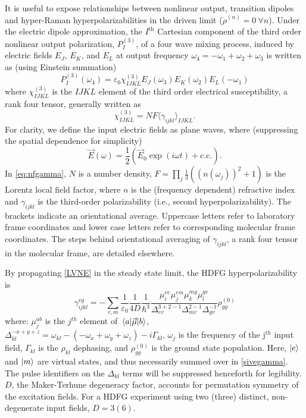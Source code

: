 \documentclass[aip, jcp, reprint, onecolumn, nofootinbib]{revtex4-2}
\begin{document}
It is useful to expose relationships between nonlinear output, transition dipoles and hyper-Raman hyperpolarizabilities in the driven limit ($\dot{\rho}^{(n)} = 0 \ \forall n$). \cite{Moad2005}
Under the electric dipole approximation, the $I^\text{th}$ Cartesian component of the third order nonlinear output polarization, ${P}^{(3)}_I$, of a four wave mixing process, induced by electric fields $E_J$, $E_K$, and $E_L$ at output frequency $\omega_4=-\omega_1 + \omega_2 + \omega_3$ is written as (using Einstein summation) \cite{RN307}
\begin{equation} \label{polarization}
{P}^{(3)}_I (\omega_4)  = \varepsilon_0 \chi^{(3)}_{IJKL} E_J(\omega_3) E_K(\omega_2) E_L(- \omega_1) 
\end{equation}
where $\chi^{(3)}_{IJKL}$ is the $IJKL$ element of the third order electrical susceptibility, a rank four tensor, generally written as
\begin{equation}\label{eq:nfgamma}
	\chi^{(3)}_{IJKL} = NF \langle \gamma_{ijkl} \rangle_{IJKL}.
\end{equation}
For clarity, we define the input electric fields as plane waves, where (suppressing the spatial dependence for simplicity)
\begin{equation}
	\vec{E}\left(\omega \right) = \frac{1}{2} \left(\vec{E}_0 \exp\left(i \omega t\right) +\text{c.c.}\right) .
\end{equation}
In \autoref{eq:nfgamma}, $N$ is a number density, $F=\prod_j  \frac{1}{3} \left({\left(n(\omega_j)\right)^2 + 1} \right)$ is the Lorentz local field factor, where $n$ is the (frequency dependent) refractive index and $\gamma_{ijkl}$ is the third-order polarizability (i.e., second hyperpolarizability). \cite{Bedeaux1973}
The brackets indicate an orientational average.\cite{Andrews1977}
Uppercase letters refer to laboratory frame coordinates and lower case letters refer to corresponding molecular frame coordinates.
The steps behind orientational averaging of $\gamma_{ijkl}$, a rank four tensor in the molecular frame, are detailed elsewhere.\cite{Andrews1977, McDonnell2024}

By propagating \autoref{LVNE} in the steady state limit,\cite{Prior1984} the HDFG hyperpolarizability is 
\begin{equation}\label{sivegamma}
		\gamma_{ijkl}^{vg} =	- \sum_{e,m} \frac{1}{\varepsilon_0} \frac{1}{4D} \frac{1}{\hbar^3} \frac{\mu^{ve}_{i} \mu^{em}_{j} \mu^{mg}_{k} \mu^{gv}_{l} }{\Delta_{ev}^{3+2-1} \Delta_{mv}^{2-1}\Delta_{gv}^{-1}}  \rho^{(0)}_{gg}
\end{equation}
where: $\mu^{ab}_{j}$ is the $j^{th}$ element of $\mel{a}{\vec{\mu}}{b}$, $\Delta_{kl}^{-x+y+z} = \omega_{kl} - (-\omega_{x}+\omega_{y} + \omega_{z}) - i\Gamma_{kl}$, $\omega_j$ is the frequency of the j$^{th}$ input field, $\Gamma_{kl}$ is the $\rho_{kl}$ dephasing, and $\rho^{(0)}_{gg}$ is the ground state population.
Here, $\ket{e}$ and $\ket{m}$ are virtual states, and thus necessarily summed over in \autoref{sivegamma}.
The pulse identifiers on the $\Delta_{kl}$ terms will be suppressed henceforth for legibility.
$D$, the Maker-Terhune degeneracy factor, accounts for permutation symmetry of the excitation fields.\cite{RN134} 
For a HDFG experiment using two (three) distinct, non-degenerate input fields, $D = 3 (6)$.
\end{document}
